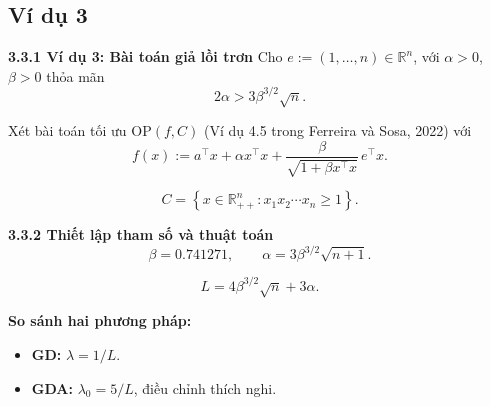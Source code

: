 \subsection{Ví dụ 3}

\begin{frame}{\textbf{\large 3.3.1 Ví dụ 3: Bài toán giả lồi trơn}}
\vspace*{-1cm}
Cho $e := (1,\ldots,n) \in \mathbb{R}^n$, với $\alpha>0$, $\beta>0$ thỏa mãn
\[
2\alpha > 3\beta^{3/2}\sqrt{n}.
\]

Xét bài toán tối ưu $\mathrm{OP}(f,C)$ (Ví dụ 4.5 trong Ferreira và Sosa, 2022) với
\[
f(x) := a^\top x + \alpha x^\top x
+ \frac{\beta}{\sqrt{1+\beta x^\top x}}\, e^\top x.
\]

\[
C = \left\{ x \in \mathbb{R}_{++}^n : x_1 x_2 \cdots x_n \ge 1 \right\}.
\]
\end{frame}

\begin{frame}{\textbf{\large 3.3.2 Thiết lập tham số và thuật toán}}\vspace*{-1cm}\[
\beta = 0.741271, \qquad
\alpha = 3\beta^{3/2}\sqrt{n+1}.
\]

\[
L = 4\beta^{3/2}\sqrt{n} + 3\alpha.
\]

\textbf{So sánh hai phương pháp:}
\begin{itemize}
\item \textbf{GD:} $\lambda = 1/L$.
\item \textbf{GDA:} $\lambda_0 = 5/L$, điều chỉnh thích nghi.
\end{itemize}
\end{frame}

